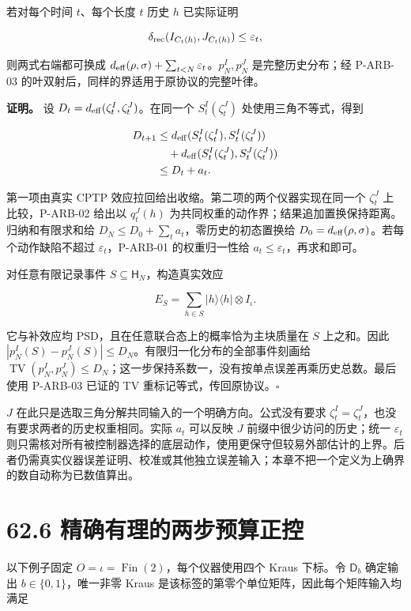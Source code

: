 \documentclass[
  11pt,
  oneside]{book}
\begin{document}
若对每个时间 \(t\)、每个长度 \(t\) 历史 \(h\) 已实际证明

\[
\delta_{\rm rec}(I_{C_t(h)},J_{C_t(h)})\le\varepsilon_t,
\]

则两式右端都可换成
\(d_{\rm eff}(\rho,\sigma)+\sum_{t<N}\varepsilon_t\)。\(p^I_N,p^J_N\)
是完整历史分布；经 P-ARB-03 的叶双射后，同样的界适用于原协议的完整叶律。

\textbf{证明。} 设 \(D_t=d_{\rm eff}(\zeta^I_t,\zeta^J_t)\)。在同一个
\(S^I_t(\zeta^J_t)\) 处使用三角不等式，得到

\[
\begin{aligned}
D_{t+1}
&\le d_{\rm eff}(S^I_t(\zeta^I_t),S^I_t(\zeta^J_t))\\
&\quad+d_{\rm eff}(S^I_t(\zeta^J_t),S^J_t(\zeta^J_t))\\
&\le D_t+a_t.
\end{aligned}
\]

第一项由真实 CPTP 效应拉回给出收缩。第二项的两个仪器实现在同一个
\(\zeta^J_t\) 上比较，P-ARB-02 给出以 \(q^J_t(h)\)
为共同权重的动作界；结果追加置换保持距离。归纳和有限求和给
\(D_N\le D_0+\sum_ta_t\)，零历史的初态置换给
\(D_0=d_{\rm eff}(\rho,\sigma)\)。若每个动作缺陷不超过
\(\varepsilon_t\)，P-ARB-01 的权重归一性给
\(a_t\le\varepsilon_t\)，再求和即可。

对任意有限记录事件 \(S\subseteq\mathsf H_N\)，构造真实效应

\[
E_S=\sum_{h\in S}|h\rangle\langle h|\otimes I_\iota.
\]

它与补效应均 PSD，且在任意联合态上的概率恰为主块质量在 \(S\)
上之和。因此
\(|p^I_N(S)-p^J_N(S)|\le D_N\)。有限归一化分布的全部事件刻画给
\(\operatorname{TV}(p^I_N,p^J_N)\le D_N\)；这一步保持系数一，没有按单点误差再乘历史总数。最后使用
P-ARB-03 已证的 TV 重标记等式，传回原协议。\(\square\)

\(J\) 在此只是选取三角分解共同输入的一个明确方向。公式没有要求
\(\zeta^I_t=\zeta^J_t\)，也没有要求两者的历史权重相同。实际 \(a_t\)
可以反映 \(J\) 前缀中很少访问的历史；统一 \(\varepsilon_t\)
则只需核对所有被控制器选择的底层动作，使用更保守但较易外部估计的上界。后者仍需真实仪器误差证明、校准或其他独立误差输入；本章不把一个定义为上确界的数自动称为已数值算出。

\section{62.6 精确有理的两步预算正控}

以下例子固定 \(O=\iota=\operatorname{Fin}(2)\)，每个仪器使用四个 Kraus
下标。令 \(\mathsf D_b\) 确定输出 \(b\in\{0,1\}\)，唯一非零 Kraus
是该标签的第零个单位矩阵，因此每个矩阵输入均满足
\end{document}
